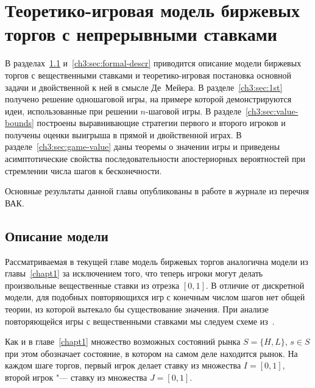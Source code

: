 \chapter{Теоретико-игровая модель биржевых торгов с непрерывными ставками} \label{chapt3}%
{
\newcommand{\Port}[1]{\pi_{#1}}
\newcommand*\dualFPS{\ensuremath{(p,\ \sigma)}}
\dualg[4][1=n, 2={\dualFPS}, 3=z, 4=\tau]{\ensuremath{g^*_{#1}(#3, #2, #4)}}

В разделах~\ref{ch3:sec:model-descr} и~\ref{ch3:sec:formal-descr} приводится описание модели биржевых торгов с вещественными ставками и теоретико-игровая постановка основной задачи и двойственной к ней в смысле Де~Мейера.
В разделе~\ref{ch3:sec:1st} получено решение одношаговой игры, на примере которой демонстрируются идеи, использованные при решении $n$-шаговой игры.
В разделе~\ref{ch3:sec:value-bounds} построены выравнивающие стратегии первого и второго игроков и получены оценки выигрыша в прямой и двойственной играх.
В разделе~\ref{ch3:sec:game-value} даны теоремы о значении игры и приведены асимптотические свойства последовательности апостериорных вероятностей при стремлении числа шагов к бесконечности.

Основные результаты данной главы опубликованы в работе \cite{pyanykh16:cont} в журнале из перечня ВАК.

\section{Описание модели}
\label{ch3:sec:model-descr}

Рассматриваемая в текущей главе модель биржевых торгов аналогична модели из главы~\ref{chapt1} за исключением того, что теперь игроки могут делать произвольные вещественные ставки из отрезка $[0, 1]$.
В отличие от дискретной модели, для подобных повторяющихся игр с конечным числом шагов нет общей теории, из которой вытекало бы существование значения.
При анализе повторяющейся игры с вещественными ставками мы следуем схеме из~\cite{demeyer02c}.

Как и в главе~\ref{chapt1} множество возможных состояний рынка $S = \{H, L\}$, $s \in S$ при этом обозначает состояние, в котором на самом деле находится рынок.
На каждом шаге торгов, первый игрок делает ставку из множества $I = [0, 1]$, второй игрок "--- ставку из множества $J = [0,1]$.

}
